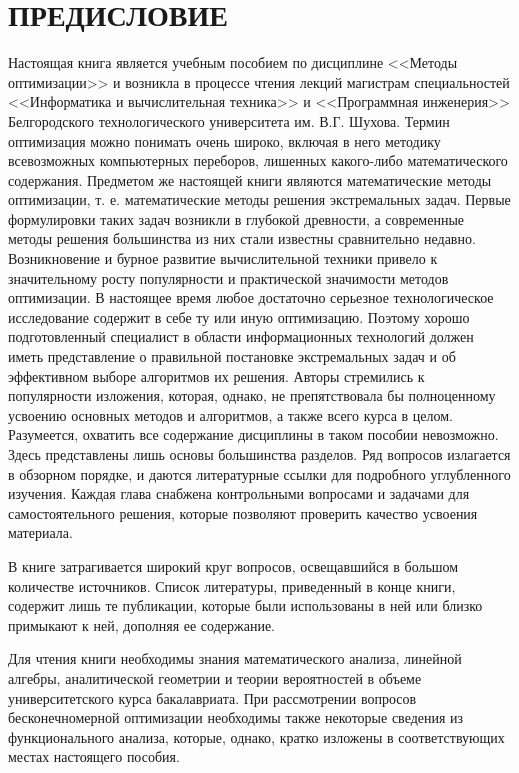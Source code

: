 
\section*{ПРЕДИСЛОВИЕ}

Настоящая книга является учебным пособием по дисциплине <<Методы оптимизации>> и возникла в процессе чтения лекций магистрам специальностей <<Информатика и вычислительная техника>> и <<Программная инженерия>> Белгородского технологического университета им. В.Г. Шухова. Термин оптимизация можно понимать очень широко, включая в него методику всевозможных компьютерных переборов, лишенных какого-либо математического содержания. Предметом же настоящей книги являются математические методы оптимизации, т. е. математические методы решения экстремальных задач. Первые формулировки таких задач возникли в глубокой древности, а современные методы решения большинства из них стали известны сравнительно недавно. Возникновение и бурное развитие вычислительной техники привело к значительному росту популярности и практической значимости методов оптимизации. В настоящее время любое достаточно серьезное технологическое исследование содержит в себе ту или иную оптимизацию. Поэтому хорошо подготовленный специалист в области информационных технологий должен иметь представление о правильной постановке экстремальных задач и об эффективном выборе алгоритмов их решения. Авторы стремились к популярности изложения, которая, однако, не препятствовала бы полноценному усвоению основных методов и алгоритмов, а также всего курса в целом. Разумеется, охватить все содержание дисциплины в таком пособии невозможно. Здесь представлены лишь основы большинства разделов. Ряд вопросов излагается в обзорном порядке, и даются литературные ссылки для подробного углубленного изучения. Каждая глава снабжена контрольными вопросами и задачами для самостоятельного решения, которые позволяют проверить качество усвоения материала.

В книге затрагивается широкий круг вопросов, освещавшийся в большом количестве источников. Список литературы, приведенный в конце книги, содержит лишь те публикации, которые были использованы в ней или близко примыкают к ней, дополняя ее содержание.

Для чтения книги необходимы знания математического анализа, линейной алгебры, аналитической геометрии и теории вероятностей в объеме университетского курса бакалавриата. При рассмотрении вопросов бесконечномерной оптимизации необходимы также некоторые сведения из функционального анализа, которые, однако, кратко изложены в соответствующих местах настоящего пособия.

